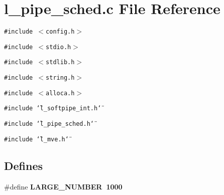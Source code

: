 \section{l\_\-pipe\_\-sched.c File Reference}
\label{l__pipe__sched_8c}
{\tt \#include $<$config.h$>$}\par
{\tt \#include $<$stdio.h$>$}\par
{\tt \#include $<$stdlib.h$>$}\par
{\tt \#include $<$string.h$>$}\par
{\tt \#include $<$alloca.h$>$}\par
{\tt \#include \char`\"{}l\_\-softpipe\_\-int.h\char`\"{}}\par
{\tt \#include \char`\"{}l\_\-pipe\_\-sched.h\char`\"{}}\par
{\tt \#include \char`\"{}l\_\-mve.h\char`\"{}}\par
\subsection*{Defines}
\begin{CompactItemize}
\item 
\#define \bf{LARGE\_\-NUMBER}~1000
\end{CompactItemize}
